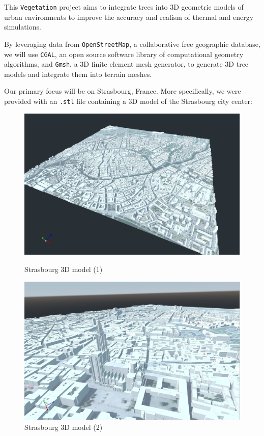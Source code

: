 \documentclass[12pt]{article}
\begin{document}
This \texttt{Vegetation} project aims to integrate trees into 3D geometric models of urban
environments to improve the accuracy and realism of thermal and energy
simulations.

By leveraging data from \texttt{OpenStreetMap}\cite{openstreetmap}, a
collaborative free geographic database, we will use \texttt{CGAL}\cite{cgal},
an open source software library of computational geometry algorithms, and
\texttt{Gmsh}\cite{gmsh}, a 3D finite element mesh generator,
to generate 3D tree models and integrate them into terrain meshes.

Our primary focus will be on Strasbourg, France. More specifically, we were
provided with an \texttt{.stl}\cite{stl} file containing a 3D model of the
Strasbourg city center:

\begin{figure}[H]
    \centering
    \begin{minipage}{0.45\textwidth}
      \centering
      \includegraphics[width=1\textwidth]{images/strasbourg-mesh-1.png}
      \caption{Strasbourg 3D model (1)}
    \end{minipage}
    \begin{minipage}{0.45\textwidth}
      \centering
      \includegraphics[width=1\textwidth]{images/strasbourg-mesh-2.png}
      \caption{Strasbourg 3D model (2)}
    \end{minipage}
\end{figure}
\end{document}
